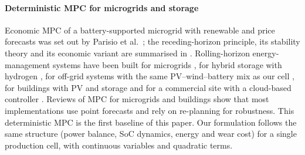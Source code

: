\documentclass[a4paper,fleqn]{cas-dc}
\begin{document}
\paragraph{Deterministic MPC for microgrids and storage} Economic MPC of a battery-supported microgrid with renewable and price forecasts was set out by Parisio et al.\ \cite{parisio2014mpc}; the receding-horizon principle, its stability theory and its economic variant are summarised in \cite{mayne2000constrained,rawlings2017model,angeli2012average,ellis2014tutorial}. Rolling-horizon energy-management systems have been built for microgrids \cite{palmabehnke2013microgrid,silvente2015rolling,kriett2012residential,bruni2015domestic}, for hybrid storage with hydrogen \cite{garciatorres2016hydrogen}, for off-grid systems with the same PV--wind--battery mix as our cell \cite{torreglosa2015energy}, for buildings with PV and storage \cite{tarragona2020model,cai2019aging} and for a commercial site with a cloud-based controller \cite{goldsworthy2022cloud}. Reviews of MPC for microgrids and buildings \cite{hu2021mpcmicrogrid,garciatorres2021mpcfunctionalities,drgona2020allyouneed,serale2018mpc} show that most implementations use point forecasts and rely on re-planning for robustness. This deterministic MPC is the first baseline of this paper. Our formulation follows the same structure (power balance, SoC dynamics, energy and wear cost) for a single production cell, with continuous variables and quadratic terms.
\end{document}
